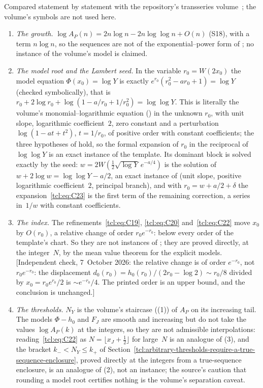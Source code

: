 \begin{remark}\label{tcl:rem:transseries}
Compared statement by statement with the repository's transseries
volume~\cite{TSvol}; the volume's symbols are not used here.
\begin{enumerate}\raggedright
\item \emph{The growth.} $\log A_P(n)=2n\log n-2n\log\log n+O(n)$ (S18),
with a term $n\log n$, so the sequences are not of the exponential--power form
of ; no instance of the volume's model is claimed.
\item \emph{The model root and the Lambert seed.} In the variable
$r_0=W(2x_0)$ the model equation $\Phi(x_0)=\log Y$ is exactly
$e^{r_0}(r_0^2-ar_0+1)=\log Y$ (checked symbolically), that is
$r_0+2\log r_0+\log(1-a/r_0+1/r_0^2)=\log\log Y$. This is literally the
volume's monomial--logarithmic equation
() in the unknown $r_0$, with unit slope,
logarithmic coefficient~$2$, zero constant and a perturbation
$\log(1-at+t^2)$, $t=1/r_0$, of positive order with constant coefficients;
the three hypotheses of  hold, so the formal
expansion of $r_0$ in the reciprocal of $\log\log Y$ is an exact instance of
the template. Its dominant block is solved exactly by the seed:
$w=2W(\frac12\sqrt{\log Y}\,e^{-a/4})$ is the solution of
$w+2\log w=\log\log Y-a/2$, an exact instance of 
(unit slope, positive logarithmic coefficient~$2$, principal branch), and
with $r_0=w+a/2+\delta$ the expansion~\eqref{tcl:eq:C23} is the first term of
the remaining correction, a series in~$1/w$ with constant coefficients.
\item \emph{The index.} The refinements~\eqref{tcl:eq:C19}, \eqref{tcl:eq:C20}
and~\eqref{tcl:eq:C22} move $x_0$ by $O(r_0)$, a relative change of order
$r_0e^{-r_0}$: below every order of the template's chart. So they are not
instances of ; they are proved directly, at the
integer~$N$, by the mean value theorem for the explicit models.
[Independent check, 7~October 2026: the relative change is of order
$e^{-r_0}$, not $r_0e^{-r_0}$: the displacement $d_0(r_0)=h_0(r_0)/(2r_0-\log2)
\sim r_0/8$ divided by $x_0=r_0e^{r_0}/2$ is $\sim e^{-r_0}/4$. The printed
order is an upper bound, and the conclusion is unchanged.]
\item \emph{The thresholds.} $N_Y$ is the volume's staircase
((1)) of $A_P$ on its increasing tail. The models
$\Phi-h_0$ and $F_J$ are smooth and increasing but do not take the values
$\log A_P(k)$ at the integers, so they are not admissible interpolations:
reading~\eqref{tcl:eq:C22} as $N=\lfloor x_J+\frac12\rfloor$ for large~$N$ is an
analogue of (3), and the bracket $k_-<N_Y\le k_+$ of
Section~\ref{tcl:arbitrary-thresholds-require-a-true-sequence-enclosure},
proved directly at the integers from a true-sequence enclosure, is an
analogue of (2), not an instance; the source's
caution that rounding a model root certifies nothing is the volume's
separation caveat.
\end{enumerate}
\end{remark}
